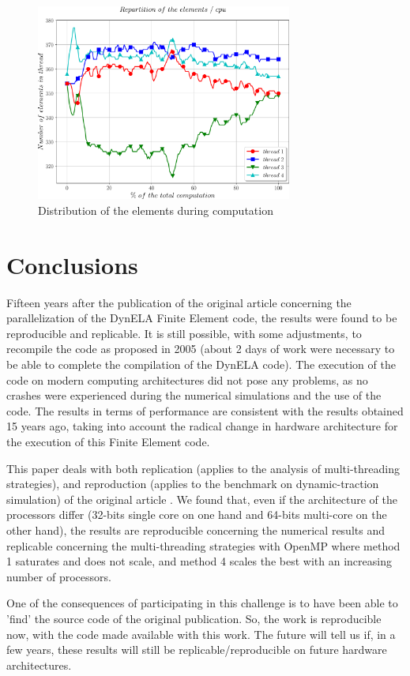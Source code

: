 \begin{figure}[h!] 
  \centering
  \includegraphics[width=0.75\textwidth]{./timethreads.pdf}
  \caption{Distribution of the elements during computation}
  \label{timethreads}
\end{figure}

\section {Conclusions}

Fifteen years after the publication of the original article \cite{Pantale:2005} concerning the parallelization of the DynELA Finite Element code, the results were found to be reproducible and replicable. It is still possible, with some adjustments, to recompile the code as proposed in 2005 (about 2 days of work were necessary to be able to complete the compilation of the DynELA code). The execution of the code on modern computing architectures did not pose any problems, as no crashes were experienced during the numerical simulations and the use of the code. The results in terms of performance are consistent with the results obtained 15 years ago, taking into account the radical change in hardware architecture for the execution of this Finite Element code.

This paper deals with both replication (applies to the analysis of multi-threading strategies), and reproduction (applies to the benchmark on dynamic-traction simulation) of the original article \cite{Pantale:2005}. We found that, even if the architecture of the processors differ (32-bits single core on one hand and 64-bits multi-core on the other hand), the results are reproducible concerning the numerical results and replicable concerning the multi-threading strategies with OpenMP where method 1 saturates and does not scale, and method 4 scales the best with an increasing number of processors.

One of the consequences of participating in this challenge is to have been able to 'find' the source code of the original publication. So, the work is reproducible now, with the code made available with this work. The future will tell us if, in a few years, these results will still be replicable/reproducible on future hardware architectures.

